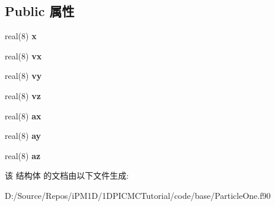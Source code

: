 \subsection*{Public 属性}
\begin{DoxyCompactItemize}
\item 
\mbox{\label{structmoduleparticleone_1_1particleone_a9821f905373c9762b92ffcb144f82406}} 
real(8) {\bfseries x}
\item 
\mbox{\label{structmoduleparticleone_1_1particleone_a1cd008199119c2459efc2407828e3bf1}} 
real(8) {\bfseries vx}
\item 
\mbox{\label{structmoduleparticleone_1_1particleone_af2f5c8b635882a0aab4bf7f3ef014ae7}} 
real(8) {\bfseries vy}
\item 
\mbox{\label{structmoduleparticleone_1_1particleone_a0758b0ca0350f4560e12ce43564fc287}} 
real(8) {\bfseries vz}
\item 
\mbox{\label{structmoduleparticleone_1_1particleone_a9dfc96cbd91821b4ad306ba845b69917}} 
real(8) {\bfseries ax}
\item 
\mbox{\label{structmoduleparticleone_1_1particleone_ad202f4400898b03f377b96e13c09b9e0}} 
real(8) {\bfseries ay}
\item 
\mbox{\label{structmoduleparticleone_1_1particleone_abae05bc43518e53cf7cc1264236be2e1}} 
real(8) {\bfseries az}
\end{DoxyCompactItemize}


该 结构体 的文档由以下文件生成\+:\begin{DoxyCompactItemize}
\item 
D\+:/\+Source/\+Repos/i\+P\+M1\+D/1\+D\+P\+I\+C\+M\+C\+Tutorial/code/base/Particle\+One.\+f90\end{DoxyCompactItemize}
